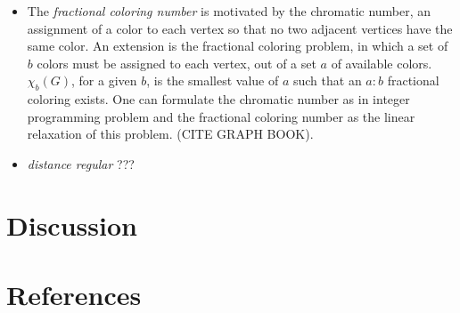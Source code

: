 \documentclass[12pt]{article}
\begin{document}
\begin{itemize}
\item The \textit{fractional coloring number} is motivated by the chromatic number, an assignment of a color to each vertex so that no two adjacent vertices have the same color. 
An extension is the fractional coloring problem, in which a set of $b$ colors must be assigned to each vertex, out of a set $a$ of available colors. 
$\chi_b(G)$, for a given $b$, is the smallest value of $a$ such that an $a:b$ fractional coloring exists. 
One can formulate the chromatic number as in integer programming problem and the fractional coloring number as the linear relaxation of this problem. (CITE GRAPH BOOK).

\item \textit{distance regular} ???

\end{itemize}


\section{Discussion}


\section{References}
\end{document}
